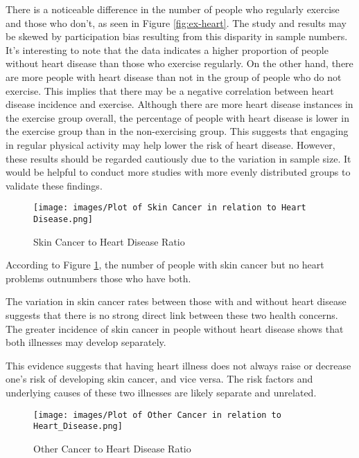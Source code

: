 \documentclass[12pt, a4paper,twoside]{report}
\numberwithin{equation}{chapter}
\begin{document}
There is a noticeable difference in the number of people who regularly exercise and those who don't, as seen in Figure \ref{fig:ex-heart}. The study and results may be skewed by participation bias resulting from this disparity in sample numbers. 
It's interesting to note that the data indicates a higher proportion of people without heart disease than those who exercise regularly. On the other hand, there are more people with heart disease than not in the group of people who do not exercise. This implies that there may be a negative correlation between heart disease incidence and exercise.
Although there are more heart disease instances in the exercise group overall, the percentage of people with heart disease is lower in the exercise group than in the non-exercising group. This suggests that engaging in regular physical activity may help lower the risk of heart disease. However, these results should be regarded cautiously due to the variation in sample size. It would be helpful to conduct more studies with more evenly distributed groups to validate these findings.

 \begin{figure}[h]
    \centering
     \texttt{[image: images/Plot of Skin Cancer in relation to Heart Disease.png]}
     \caption{Skin Cancer to Heart Disease Ratio}
     \label{fig:skin-heart}
 \end{figure}

According to Figure \ref{fig:skin-heart}, the number of people with skin cancer but no heart problems outnumbers those who have both. 

The variation in skin cancer rates between those with and without heart disease suggests that there is no strong direct link between these two health concerns. The greater incidence of skin cancer in people without heart disease shows that both illnesses may develop separately. 

This evidence suggests that having heart illness does not always raise or decrease one's risk of developing skin cancer, and vice versa. The risk factors and underlying causes of these two illnesses are likely separate and unrelated.

 \begin{figure}[htb]
     \centering
     \texttt{[image: images/Plot of Other Cancer in relation to Heart\_Disease.png]}
     \caption{Other Cancer to Heart Disease Ratio}
     \label{fig:other-heart}
 \end{figure}
\end{document}
